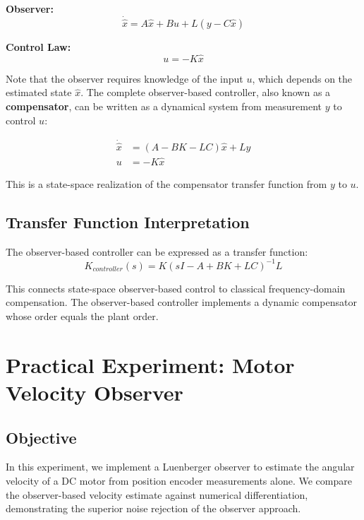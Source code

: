 \textbf{Observer:}
\begin{equation}
\dot{\hat{x}} = A\hat{x} + Bu + L(y - C\hat{x})
\end{equation}

\textbf{Control Law:}
\begin{equation}
u = -K\hat{x}
\end{equation}

Note that the observer requires knowledge of the input $u$, which depends on the estimated state $\hat{x}$. The complete observer-based controller, also known as a \textbf{compensator}, can be written as a dynamical system from measurement $y$ to control $u$:

\begin{align}
\dot{\hat{x}} &= (A - BK - LC)\hat{x} + Ly \\
u &= -K\hat{x}
\end{align}

This is a state-space realization of the compensator transfer function from $y$ to $u$.

\subsection{Transfer Function Interpretation}

The observer-based controller can be expressed as a transfer function:
\begin{equation}
K_{controller}(s) = K(sI - A + BK + LC)^{-1}L
\end{equation}

This connects state-space observer-based control to classical frequency-domain compensation. The observer-based controller implements a dynamic compensator whose order equals the plant order.

\section{Practical Experiment: Motor Velocity Observer}

\subsection{Objective}

In this experiment, we implement a Luenberger observer to estimate the angular velocity of a DC motor from position encoder measurements alone. We compare the observer-based velocity estimate against numerical differentiation, demonstrating the superior noise rejection of the observer approach.

